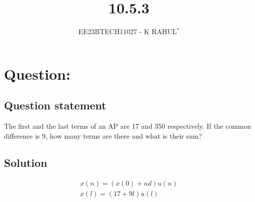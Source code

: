 \documentclass[journal,12pt,twocolumn]{IEEEtran}
\theoremstyle{remark}
\begin{document}

\vspace{3cm}
\title{10.5.3}
\author{EE23BTECH11027 - K RAHUL$^{*}$%
}
\maketitle
\newpage
\bigskip
\renewcommand{\thefigure}{\theenumi}
\renewcommand{\thetable}{\theenumi}
\section{Question:}
\subsection{Question statement}
The first and the last terms of an AP are 17 and 350 respectively. If the common difference
is 9, how many terms are there and what is their sum?
\subsection{Solution}
\begin{table}[ht]

\end{table}
\begin{align}
x(n) = (x(0) + nd)u(n)\\
x(l)=(17+9l)u(l)
\end{align}
\end{document}
